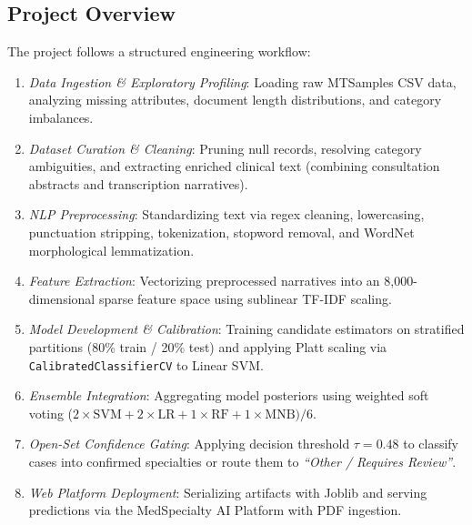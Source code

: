 \subsection{Project Overview}
The project follows a structured engineering workflow:
\begin{enumerate}
    \item \textit{Data Ingestion \& Exploratory Profiling}: Loading raw MTSamples CSV data, analyzing missing attributes, document length distributions, and category imbalances.
    \item \textit{Dataset Curation \& Cleaning}: Pruning null records, resolving category ambiguities, and extracting enriched clinical text (combining consultation abstracts and transcription narratives).
    \item \textit{NLP Preprocessing}: Standardizing text via regex cleaning, lowercasing, punctuation stripping, tokenization, stopword removal, and WordNet morphological lemmatization.
    \item \textit{Feature Extraction}: Vectorizing preprocessed narratives into an 8,000-dimensional sparse feature space using sublinear TF-IDF scaling.
    \item \textit{Model Development \& Calibration}: Training candidate estimators on stratified partitions (80\% train / 20\% test) and applying Platt scaling via \texttt{CalibratedClassifierCV} to Linear SVM.
    \item \textit{Ensemble Integration}: Aggregating model posteriors using weighted soft voting ($2 \times \text{SVM} + 2 \times \text{LR} + 1 \times \text{RF} + 1 \times \text{MNB}) / 6$.
    \item \textit{Open-Set Confidence Gating}: Applying decision threshold $\tau = 0.48$ to classify cases into confirmed specialties or route them to \textit{``Other / Requires Review''}.
    \item \textit{Web Platform Deployment}: Serializing artifacts with Joblib and serving predictions via the MedSpecialty AI Platform with PDF ingestion.
\end{enumerate}

